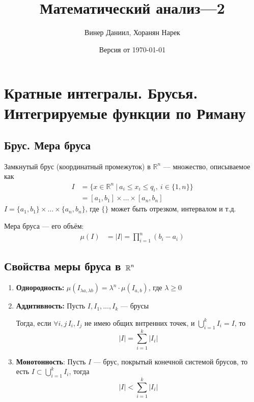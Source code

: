 \documentclass[a4paper, 10pt]{article}
\title{\LARGE{Математический анализ—2}}
\author{Винер Даниил, Хоранян Нарек}
\date{Версия от \today}
\begin{document}
\maketitle
\tableofcontents
\newpage
\setlength{\parindent}{15pt}
\setlength{\parskip}{2mm}
\section{Кратные интегралы. Брусья. Интегрируемые функции по Риману}
\subsection{Брус. Мера бруса}
 Замкнутый брус (координатный промежуток) в $\mathbb{R}^n$ — множество, описываемое как
\begin{equation*}
\begin{aligned}
    I&=\{x\in\mathbb{R}^n\ |\ a_i\leqslant x_i\leqslant q_i,\ i\in\{1,n\}\}\\
    &=\left[a_1,b_1\right]\times\ldots\times\left[a_n,b_n\right]
\end{aligned}
\end{equation*}
\comment $I=\{a_1,b_1\}\times\ldots\times\{a_n,b_n\}$, где $\{\}$ может быть отрезком, интервалом и т.д.

 Мера бруса — его объём:
\begin{equation*}
    \begin{aligned}
        \mu(I)&=|I|
        =\prod_{i=1}^{n} (b_i-a_i)
    \end{aligned}
\end{equation*}

\subsection{Свойства меры бруса в $\operatorname{\mathbb{R}}^n$}
\begin{enumerate}
    \item \textbf{Однородность:} $\mu(I_{\lambda a,\lambda b})=\lambda^n\cdot\mu(I_{a,b})$, где $\lambda\geqslant
    0$
    \item \textbf{Аддитивность:} Пусть $I, I_1, \ldots, I_k$ — брусы
    
    Тогда, если $\forall i, j\, I_i, I_j$ не имею общих внтренних точек, и $\displaystyle\bigcup_{i=1}^kI_i = I$, то
    $$|I| = \sum_{i=1}^k|I_i|$$
    \item \textbf{Монотонность}: Пусть $I$ — брус, покрытый конечной системой брусов, то есть $I\subset \displaystyle\bigcup_{i=1}^kI_i$, тогда
    $$|I| < \sum_{i=1}^k|I_i|$$
\end{enumerate}
\end{document}
